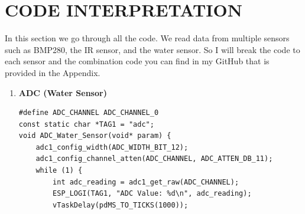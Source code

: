 \section{CODE INTERPRETATION}
         In this section we go through all the code. We read data from multiple sensors such as BMP280, the IR sensor, and the water sensor. So I will break the code to each sensor and the combination code you can find in my GitHub that is provided in the Appendix.
         \begin{enumerate}
             \item \textbf{ADC (Water Sensor)}
             \begin{lstlisting}
#define ADC_CHANNEL ADC_CHANNEL_0
const static char *TAG1 = "adc";
void ADC_Water_Sensor(void* param) {
    adc1_config_width(ADC_WIDTH_BIT_12);
    adc1_config_channel_atten(ADC_CHANNEL, ADC_ATTEN_DB_11);
    while (1) {
        int adc_reading = adc1_get_raw(ADC_CHANNEL);
        ESP_LOGI(TAG1, "ADC Value: %d\n", adc_reading);
        vTaskDelay(pdMS_TO_TICKS(1000));
    

\end{lstlisting}
\end{enumerate}
